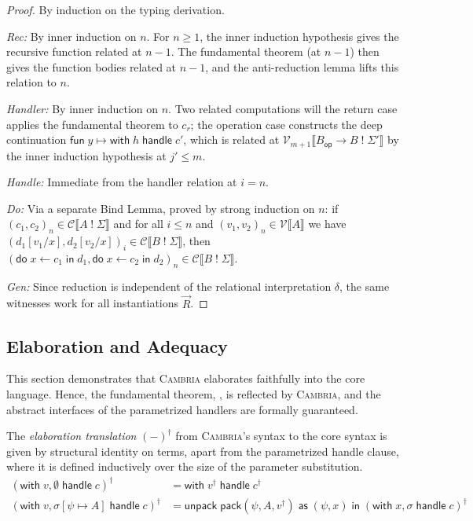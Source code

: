 \documentclass[acmsmall,screen,review,anonymous]{acmart}
\newcommand{\cambria}{\textsc{Cambria}}
\newcommand{\tfun}[2]{#1 \to #2}
\newcommand{\comp}[2]{#1\;!\;#2}
\newcommand{\op}{\mathsf{op}}
\newcommand{\ddo}{\mathsf{do}\;}
\newcommand{\iin}{\;\mathsf{in}\;}
\newcommand{\fun}{\mathsf{fun}\;}
\newcommand{\with}{\mathsf{with}\;}
\newcommand{\handle}{\;\mathsf{handle}\;}
\newcommand{\pack}{\mathsf{pack}}
\newcommand{\unpack}{\mathsf{unpack}\;}
\newcommand{\as}{\;\mathsf{as}\;}
\newcommand{\Sig}{\Sigma}
\newcommand{\VV}{\mathcal{V}}
\newcommand{\CC}{\mathcal{C}}
\begin{document}
\begin{proof}
By induction on the typing derivation. 

\emph{Rec:} By inner induction on $n$.
For $n \geq 1$, the inner induction hypothesis gives the recursive function related at $n{-}1$.
The fundamental theorem (at $n{-}1$) then gives the function bodies related at $n{-}1$,
and the anti-reduction lemma lifts this relation to $n$.

\emph{Handler:} By inner induction on $n$.
Two related computations will the return case applies the fundamental theorem to $c_r$;
the operation case constructs the deep continuation $\fun y \mapsto \with h \handle c'$,
which is related at $\VV_{m+1}\llbracket \tfun{B_\op}{\comp{B}{\Sig'}} \rrbracket$ by the inner induction hypothesis at $j' \leq m$.

\emph{Handle:} Immediate from the handler relation at $i = n$.

\emph{Do:} Via a separate Bind Lemma, proved by strong induction on $n$:
if $(c_1, c_2)_n \in \CC\llbracket \comp{A}{\Sig} \rrbracket$ and for all $i \leq n$ and $(v_1, v_2)_n \in \VV\llbracket A \rrbracket$
we have $(d_1[v_1/x], d_2[v_2/x])_i \in \CC\llbracket \comp{B}{\Sig} \rrbracket$,
then $(\ddo x \leftarrow c_1 \iin d_1, \ddo x \leftarrow c_2 \iin d_2)_n \in \CC\llbracket \comp{B}{\Sig} \rrbracket$.

\emph{Gen:} Since reduction is independent of the relational interpretation $\delta$, the same witnesses work for all instantiations $\vec{R}$.
\end{proof}


\subsection{Elaboration and Adequacy} \label{sec:elaboration}

\newcommand{\elab}[1]{{(#1)^\dagger}}

This section demonstrates that \cambria{} elaborates faithfully into the core language.
Hence, the fundamental theorem, , is reflected by \cambria{},
and the abstract interfaces of the parametrized handlers are formally guaranteed.

\begin{definition}
  The \emph{elaboration translation} $\elab{{-}}$ from \cambria{}'s syntax to the core syntax is given by
  structural identity on terms, apart from the parametrized handle clause, where it is defined inductively over the size of the parameter substitution.
  \begin{align*}
    \elab{\with v, \emptyset \handle c}              &= \with v^\dagger \handle c^\dagger \\[-2pt]
    \elab{\with v, \sigma[\psi \mapsto A] \handle c} &= \unpack \pack(\psi, A, v^\dagger) \as (\psi, x) \iin \elab{\with x, \sigma \handle c}
  \end{align*}
\end{definition}
\end{document}
